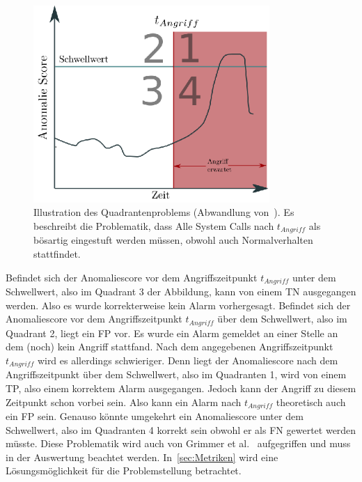                     \begin{figure}[ht]
                        \centering
                        \includegraphics[width=0.8\textwidth]{images/q_problem.eps}
                        \caption[ass]{Illustration des Quadrantenproblems (Abwandlung von~\cite{IDSTHREADGRIMMER2021}).
                        Es beschreibt die Problematik, dass Alle System Calls nach $t_{Angriff}$ als bösartig eingestuft werden müssen, obwohl auch Normalverhalten stattfindet.}
                        \label{fig:quadrant}
                    \end{figure}

                    Befindet sich der Anomaliescore vor dem Angriffszeitpunkt $t_{Angriff}$ unter dem Schwellwert, also im Quadrant 3 der Abbildung, kann von einem \ac{TN} ausgegangen werden.
                    Also es wurde korrekterweise kein Alarm vorhergesagt.
                    Befindet sich der Anomaliescore vor dem Angriffszeitpunkt $t_{Angriff}$ über dem Schwellwert, also im Quadrant 2, liegt ein \ac{FP} vor.
                    Es wurde ein Alarm gemeldet an einer Stelle an dem (noch) kein Angriff stattfand.
                    Nach dem angegebenen Angriffszeitpunkt $t_{Angriff}$ wird es allerdings schwieriger.
                    Denn liegt der Anomaliescore nach dem Angriffszeitpunkt über dem Schwellwert, also im Quadranten 1, wird von einem \ac{TP}, also einem korrektem Alarm ausgegangen.
                    Jedoch kann der Angriff zu diesem Zeitpunkt schon vorbei sein.
                    Also kann ein Alarm nach $t_{Angriff}$ theoretisch auch ein \ac{FP} sein. 
                    Genauso könnte umgekehrt ein Anomaliescore unter dem Schwellwert, also im Quadranten 4 korrekt sein obwohl er als \ac{FN} gewertet werden müsste.
                    Diese Problematik wird auch von Grimmer et al.~\cite{IDSTHREADGRIMMER2021} aufgegriffen und muss in der Auswertung beachtet werden. 
                    In~\autoref{sec:Metriken} wird eine Lösungsmöglichkeit für die Problemstellung betrachtet.


